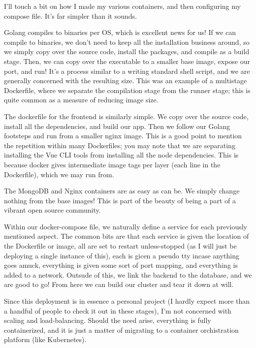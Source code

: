 \documentclass[11pt, twoside, reqno]{book}
\begin{document}
I'll touch a bit on how I made my various containers, and then configuring my compose file. It's far simpler than it sounds.

\label{Go Backend Dockerfile}

Golang compiles to binaries per OS, which is excellent news for us! If we can compile to binaries, we don't need to keep all the installation business around, so we simply copy over the source code, install the packages, and compile as a build stage. Then, we can copy over the executable to a smaller base image, expose our port, and run! It's a process similar to a writing standard shell script, and we are generally concerned with the resulting size. This was an example of a multistage Dockerfile, where we separate the compilation stage from the runner stage; this is quite common as a measure of reducing image size.

\label{Vue Frontend Dockerfile}

The dockerfile for the frontend is similarly simple. We copy over the source code, install all the dependencies, and build our app. Then we follow our Golang footsteps and run from a smaller nginx image. This is a good point to mention the repetition within many Dockerfiles; you may note that we are separating installing the Vue CLI tools from installing all the node dependencies. This is because docker gives intermediate image tags per layer (each line in the Dockerfile), which we may run from.

\label{Mongo and Nginx}

The MongoDB and Nginx containers are as easy as can be. We simply change nothing from the base images! This is part of the beauty of being a part of a vibrant open source community.

\label{The Composition}

Within our docker-compose file, we naturally define a service for each previously mentioned aspect. The common bits are that each service is given the location of the Dockerfile or image, all are set to restart unless-stopped (as I will just be deploying a single instance of this), each is gicen a pseudo tty incase anything goes amuck, everything is given some sort of port mapping, and everything is added to a network. Outsude of this, we link the backend to the database, and we are good to go! From here we can build our cluster and tear it down at will.

Since this deployment is in essence a personal project (I hardly expect more than a handful of people to check it out in these stages), I'm not concerned with scaling and load-balancing. Should the need arise, everything is fully containerized, and it is just a matter of migrating to a container orchistration platform (like Kubernetes).
\end{document}
